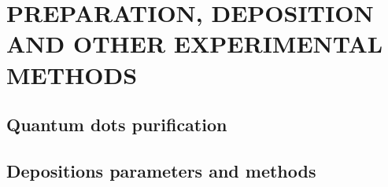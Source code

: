 \chapter{PREPARATION, DEPOSITION AND OTHER EXPERIMENTAL METHODS}

\section{Quantum dots purification}


\section{Depositions parameters and methods}



